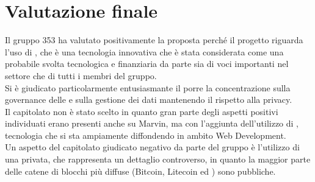 \documentclass[StudioDiFattibilità.tex]{subfiles}
\begin{document}
\section{Valutazione finale}
Il gruppo 353 ha valutato positivamente la proposta perché il progetto riguarda l'uso di , che è una tecnologia innovativa che è stata considerata come una probabile svolta tecnologica e finanziaria da parte sia di voci importanti nel settore che di tutti i membri del gruppo.\\
Si è giudicato particolarmente entusiasmante il porre la concentrazione sulla governance delle  e sulla gestione dei dati mantenendo il rispetto alla privacy.\\
Il capitolato non è stato scelto in quanto gran parte degli aspetti positivi individuati erano presenti anche su Marvin, ma con l'aggiunta dell'utilizzo di , tecnologia che si sta ampiamente diffondendo in ambito Web Development.\\
Un aspetto del capitolato giudicato negativo da parte del gruppo è l'utilizzo di una  privata, che rappresenta un dettaglio controverso, in quanto la maggior parte delle catene di blocchi più diffuse (Bitcoin, Litecoin ed ) sono pubbliche.
\end{document}
